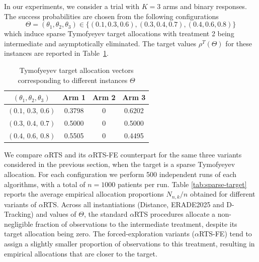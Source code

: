 \documentclass[11pt]{article}
\theoremstyle{plain}
\theoremstyle{definition}
\begin{document}

In our experiments, we consider a trial with $K=3$ arms and binary responses. The success probabilities are chosen from the following configurations
\[\Theta=(\theta_1,\theta_2,\theta_3) \in \{(0.1,0.3,0.6), (0.3,0.4,0.7), (0.4,0.6,0.8)\}\]
which induce sparse Tymofyeyev target allocations with treatment 2 being intermediate and asymptotically eliminated. The target values \(\rho^{T}\left(\Theta\right)\) for these instances are reported  in Table~\ref{tab:rho_tymo}.

\begin{table}[b]
	\centering
	\begin{tabular}{c|ccc}
		\hline
		$(\theta_1,\theta_2,\theta_3)$ & Arm 1 & Arm 2 & Arm 3 \\
		\hline
		$(0.1,\,0.3,\,0.6)$ & 0.3798 & 0 & 0.6202 \\
		$(0.3,\,0.4,\,0.7)$ & 0.5000 & 0 & 0.5000 \\
		$(0.4,\,0.6,\,0.8)$ & 0.5505 & 0 & 0.4495 \\
		\hline
	\end{tabular}
	\caption{\label{tab:rho_tymo}Tymofyeyev target allocation vectors corresponding to different instances $\Theta$}
\end{table}

We compare \(\alpha\)RTS and its \(\alpha\)RTS-FE counterpart for the same three variants considered in the previous section, when the target is a sparse Tymofyeyev allocation.
For each configuration we perform 500 independent runs of each algorithms, with a total of \(n=1000\) patients per run. Table \ref{tab:sparse-target} reports the average empirical allocation proportions $N_{n,k}/n$ obtained for different variants of $\alpha$RTS.
Across all instantiations (Distance, ERADE2025 and D-Tracking) and values of $\Theta$, the standard \(\alpha\)RTS procedures allocate a non-negligible fraction of observations to the intermediate treatment, despite its target allocation being zero. The forced-exploration variants (\(\alpha\)RTS-FE) tend to assign a slightly smaller proportion of observations to this treatment, resulting in empirical allocations that are closer to the target. %
	
	
\end{document}
